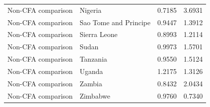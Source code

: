 \begin{table}
\begin{tabular}[t]{llrr}
Non-CFA comparison & Nigeria & 0.7185 & 3.6931\\
Non-CFA comparison & Sao Tome and Principe & 0.9447 & 1.3912\\
Non-CFA comparison & Sierra Leone & 0.8993 & 1.2114\\
\addlinespace
Non-CFA comparison & Sudan & 0.9973 & 1.5701\\
Non-CFA comparison & Tanzania & 0.9550 & 1.5124\\
Non-CFA comparison & Uganda & 1.2175 & 1.3126\\
Non-CFA comparison & Zambia & 0.8432 & 2.0434\\
Non-CFA comparison & Zimbabwe & 0.9760 & 0.7340\\
\bottomrule
\end{tabular}
\end{table}